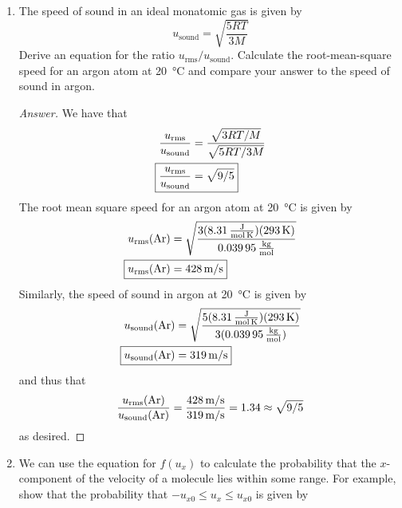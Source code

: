 \documentclass[../psets.tex]{subfiles}
\begin{document}
\begin{enumerate}[label={\textbf{27-\arabic*.}},leftmargin=3.5em]
\begin{proof}[Answer]
\begin{equation*}
        \end{equation*}
    \end{proof}
    \item The speed of sound in an ideal monatomic gas is given by
    \begin{equation*}
        u_\text{sound} = \sqrt{\frac{5RT}{3M}}
    \end{equation*}
    Derive an equation for the ratio $u_\text{rms}/u_\text{sound}$. Calculate the root-mean-square speed for an argon atom at \SI{20}{\celsius} and compare your answer to the speed of sound in argon.
    \begin{proof}[Answer]
        We have that
        \begin{align*}
            \frac{u_\text{rms}}{u_\text{sound}} &= \frac{\sqrt{3RT/M}}{\sqrt{5RT/3M}}\\
            \Aboxed{\frac{u_\text{rms}}{u_\text{sound}} &= \sqrt{9/5}}
        \end{align*}
        The root mean square speed for an argon atom at \SI{20}{\celsius} is given by
        \begin{align*}
            u_\text{rms}(\ce{Ar}) &= \sqrt{\frac{3(\SI[per-mode=fraction]{8.31}{\joule\per\mole\per\kelvin})(\SI{293}{\kelvin})}{\SI[per-mode=fraction]{0.03995}{\kilo\gram\per\mole}}}\\
            \Aboxed{u_\text{rms}(\ce{Ar}) &= \SI[per-mode=symbol]{428}{\meter\per\second}}
        \end{align*}
        Similarly, the speed of sound in argon at \SI{20}{\celsius} is given by
        \begin{align*}
            u_\text{sound}(\ce{Ar}) &= \sqrt{\frac{5(\SI[per-mode=fraction]{8.31}{\joule\per\mole\per\kelvin})(\SI{293}{\kelvin})}{3(\SI[per-mode=fraction]{0.03995}{\kilo\gram\per\mole})}}\\
            \Aboxed{u_\text{sound}(\ce{Ar}) &= \SI[per-mode=symbol]{319}{\meter\per\second}}
        \end{align*}
        and thus that
        \begin{equation*}
            \frac{u_\text{rms}(\ce{Ar})}{u_\text{sound}(\ce{Ar})} = \frac{\SI[per-mode=symbol]{428}{\meter\per\second}}{\SI[per-mode=symbol]{319}{\meter\per\second}}
            = 1.34
            \approx \sqrt{9/5}
        \end{equation*}
        as desired.
    \end{proof}
    \setcounter{enumi}{11}
    \item We can use the equation for $f(u_x)$ to calculate the probability that the $x$-component of the velocity of a molecule lies within some range. For example, show that the probability that $-u_{x0}\leq u_x\leq u_{x0}$ is given by

\end{enumerate}
\end{document}
